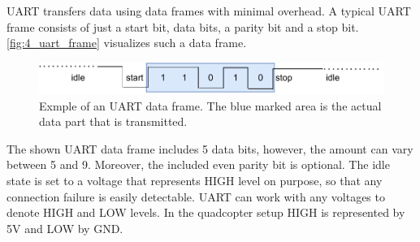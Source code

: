 \noindent UART transfers data using data frames with minimal overhead.
A typical UART frame consists of just a start bit, data bits, a parity bit and
a stop bit.
\autoref{fig:4_uart_frame} visualizes such a data frame. 
\begin{figure}[!h]
    \centering
    \includegraphics[scale=0.8]{uart_frame.pdf}
    \caption[UART data frame]{Exmple of an UART data frame. The blue marked
    area is the actual data part that is transmitted.}
    \label{fig:4_uart_frame}
\end{figure}
\FloatBarrier
\noindent The shown UART data frame includes 5 data bits, however, the amount
can vary between 5 and 9.
Moreover, the included even parity bit is optional.
The idle state is set to a voltage that represents HIGH level on purpose, so
that any connection failure is easily detectable.
UART can work with any voltages to denote HIGH and LOW levels.
In the quadcopter setup HIGH is represented by 5V and LOW by GND.
